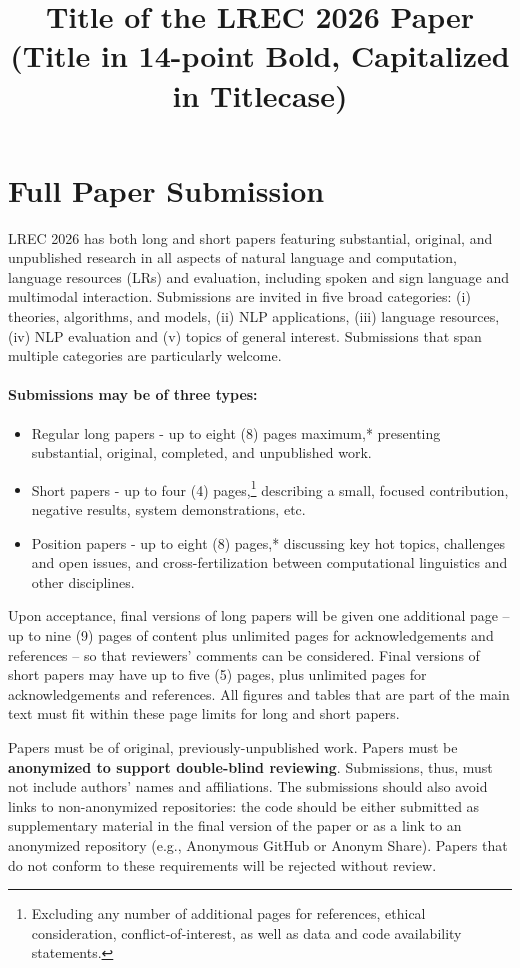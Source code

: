 \documentclass[10pt, a4paper]{article}
\title{Title of the LREC 2026 Paper (Title in 14-point Bold, Capitalized in Titlecase)}
\begin{document}
\maketitleabstract

\section{Full Paper Submission}

LREC 2026 has both long and short papers featuring substantial, original, and unpublished research in all aspects of natural language and computation, language resources (LRs) and evaluation, including spoken and sign language and multimodal interaction. Submissions are invited in five broad categories: (i) theories, algorithms, and models, (ii) NLP applications, (iii) language resources, (iv) NLP evaluation and (v) topics of general interest. Submissions that span multiple categories are particularly welcome.   

\paragraph{Submissions may be of three types:}

\begin{itemize}
\item Regular long papers - up to eight (8) pages maximum,* presenting substantial, original, completed, and unpublished work.
\item Short papers - up to four (4) pages,\footnote{Excluding any number of additional pages for references, ethical consideration, conflict-of-interest, as well as data and code availability statements.} describing a small, focused contribution, negative results, system demonstrations, etc.
\item  Position papers - up to eight (8) pages,* discussing key hot topics, challenges and open issues, and cross-fertilization between computational linguistics and other disciplines.
\end{itemize}

Upon acceptance, final versions of long papers will be given one
additional page – up to nine (9) pages of content plus unlimited pages for acknowledgements and references – so that reviewers’ comments can be considered. Final versions of short papers may have up to five (5) pages, plus unlimited pages for acknowledgements and references. All figures and tables that are part of the main text must fit within these page limits for long and short papers.

Papers must be of original, previously-unpublished work. Papers must be \textbf{anonymized to support double-blind reviewing}. Submissions, thus, must not include authors’ names and affiliations. The submissions should also avoid links to non-anonymized repositories: the code should be either submitted as supplementary material in the final version of the paper or as a link to an anonymized repository (e.g., Anonymous GitHub or Anonym Share). Papers that do not conform to these requirements will be rejected without review.
\end{document}
